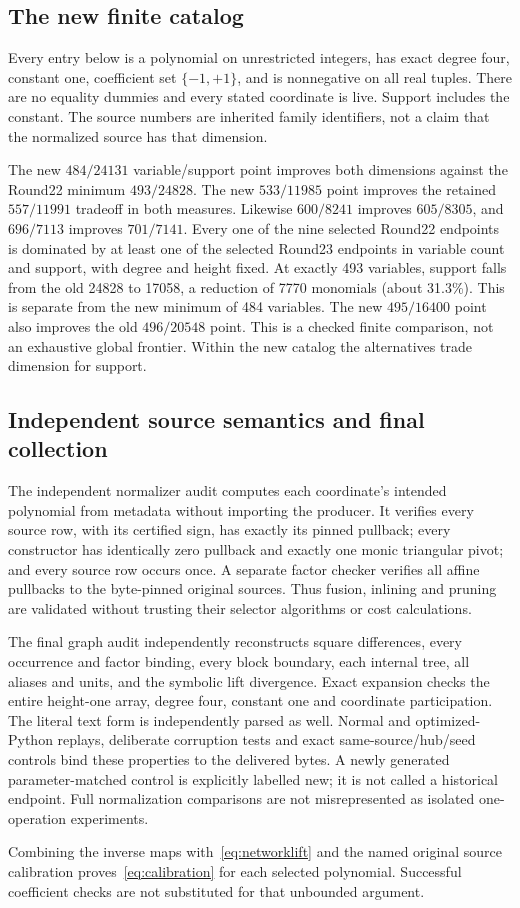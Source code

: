 \subsection{The new finite catalog}
Every entry below is a polynomial on unrestricted integers, has exact degree
four, constant one, coefficient set $\{-1,+1\}$, and is nonnegative on all
real tuples. There are no equality dummies and every stated coordinate is
live. Support includes the constant. The source numbers are inherited family
identifiers, not a claim that the normalized source has that dimension.


The new $484/24131$ variable/support point improves both dimensions against
the Round22 minimum $493/24828$. The new $533/11985$ point improves the
retained $557/11991$ tradeoff in both measures. Likewise $600/8241$ improves
$605/8305$, and $696/7113$ improves $701/7141$. Every one of the nine selected
Round22 endpoints is dominated by at least one of the selected Round23
endpoints in variable count and support, with degree and height fixed.
At exactly 493 variables, support falls from the old 24828 to 17058,
a reduction of 7770 monomials (about 31.3\%). This is separate from the
new minimum of 484 variables. The new $495/16400$ point also improves the
old $496/20548$ point.
This is a checked finite comparison, not an exhaustive global frontier.
Within the new catalog the alternatives trade dimension for support.

\subsection{Independent source semantics and final collection}
The independent normalizer audit computes each coordinate's intended
polynomial from metadata without importing the producer. It verifies every
source row, with its certified sign, has exactly its pinned pullback;
every constructor has identically zero pullback and exactly one monic
triangular pivot; and every source row occurs once. A separate factor
checker verifies all affine pullbacks to the byte-pinned original sources.
Thus fusion, inlining and pruning are validated without trusting their
selector algorithms or cost calculations.

The final graph audit independently reconstructs square differences, every
occurrence and factor binding, every block boundary, each internal tree,
all aliases and units, and the symbolic lift divergence. Exact expansion
checks the entire height-one array, degree four, constant one and coordinate
participation. The literal text form is independently parsed as well.
Normal and optimized-Python replays, deliberate corruption tests and exact
same-source/hub/seed controls bind these properties to the delivered bytes.
A newly generated parameter-matched control is explicitly labelled new; it
is not called a historical endpoint. Full normalization comparisons are not
misrepresented as isolated one-operation experiments.

Combining the inverse maps with~\eqref{eq:networklift} and the named original
source calibration proves~\eqref{eq:calibration} for each selected polynomial.
Successful coefficient checks are not substituted for that unbounded argument.

